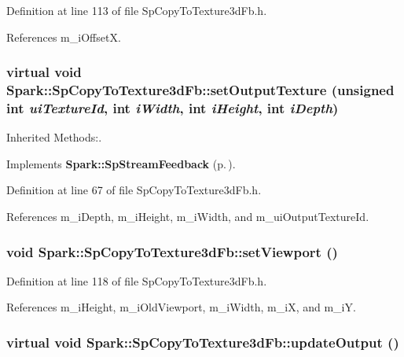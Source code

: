 Definition at line 113 of file Sp\-Copy\-To\-Texture3d\-Fb.h.

References m\_\-i\-Offset\-X.
\subsubsection{\setlength{\rightskip}{0pt plus 5cm}virtual void Spark::Sp\-Copy\-To\-Texture3d\-Fb::set\-Output\-Texture (unsigned int {\em ui\-Texture\-Id}, int {\em i\-Width}, int {\em i\-Height}, int {\em i\-Depth})\hspace{0.3cm}{\tt  [inline, virtual]}}\label{classSpark_1_1SpCopyToTexture3dFb_a2}


Inherited Methods:. 



Implements {\bf Spark::Sp\-Stream\-Feedback} {\rm (p.\,\pageref{classSpark_1_1SpStreamFeedback_a0})}.

Definition at line 67 of file Sp\-Copy\-To\-Texture3d\-Fb.h.

References m\_\-i\-Depth, m\_\-i\-Height, m\_\-i\-Width, and m\_\-ui\-Output\-Texture\-Id.
\subsubsection{\setlength{\rightskip}{0pt plus 5cm}void Spark::Sp\-Copy\-To\-Texture3d\-Fb::set\-Viewport ()\hspace{0.3cm}{\tt  [inline]}}\label{classSpark_1_1SpCopyToTexture3dFb_a6}


Definition at line 118 of file Sp\-Copy\-To\-Texture3d\-Fb.h.

References m\_\-i\-Height, m\_\-i\-Old\-Viewport, m\_\-i\-Width, m\_\-i\-X, and m\_\-i\-Y.
\subsubsection{\setlength{\rightskip}{0pt plus 5cm}virtual void Spark::Sp\-Copy\-To\-Texture3d\-Fb::update\-Output ()\hspace{0.3cm}{\tt  [inline, virtual]}}\label{classSpark_1_1SpCopyToTexture3dFb_a3}




